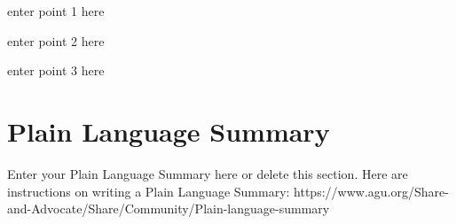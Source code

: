 \documentclass[draft]{agujournal2019}
\begin{document}

\begin{keypoints}
\item enter point 1 here
\item enter point 2 here
\item enter point 3 here
\end{keypoints}

%
%

%
%


\begin{abstract}
[ enter your Abstract here ]
\end{abstract}

\section*{Plain Language Summary}
Enter your Plain Language Summary here or delete this section.
Here are instructions on writing a Plain Language Summary: 
https://www.agu.org/Share-and-Advocate/Share/Community/Plain-language-summary


%
%
\end{document}
